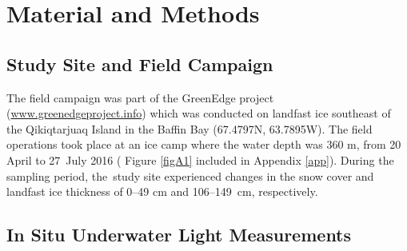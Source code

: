 \documentclass[applsci,article,accept,moreauthors,pdftex,10pt,a4paper]{Definitions/mdpi}
\begin{document}
\section{Material and Methods}
\unskip
\subsection{Study Site and Field Campaign}

The field campaign was part of the GreenEdge project (\url{www.greenedgeproject.info}) which was conducted on landfast ice southeast of the Qikiqtarjuaq Island in the Baffin Bay (67.4797N, 63.7895W). The field operations took place at an ice camp where the water depth was 360 m, from 20 April  to 27~July  2016 ( Figure  \ref{figA1} included in  Appendix \ref{app}). During the sampling period, the~study site experienced changes in the snow cover and landfast ice thickness of 0--49 cm and 106--149~cm, respectively.

\subsection{In Situ Underwater Light Measurements}
\end{document}
